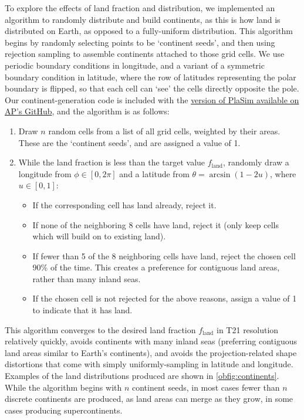 \documentclass[fleqn,usenatbib]{mnras}
\begin{document}
To explore the effects of land fraction and distribution, we implemented an algorithm to randomly distribute and build continents, as this is how land is distributed on Earth, as opposed to a fully-uniform distribution. This algorithm begins by randomly selecting points to be `continent seeds', and then using rejection sampling to assemble continents attached to those grid cells. We use periodic boundary conditions in longitude, and a variant of a symmetric boundary condition in latitude, where the row of latitudes representing the polar boundary is flipped, so that each cell can `see' the cells directly opposite the pole. Our continent-generation code is included with the \href{https://doi.org/10.5281/zenodo.2602241}{version of PlaSim available on AP's GitHub}, and the algorithm is as follows:
\begin{enumerate}
\item Draw $n$ random cells from a list of all grid cells, weighted by their areas. These are the `continent seeds', and are assigned a value of 1.
\item While the land fraction is less than the target value $f_\text{land}$, randomly draw a longitude from $\phi\in[0,2\pi]$ and a latitude from $\theta=\arcsin(1-2u)$, where $u\in[0,1]$:
\begin{itemize}
    \item If the corresponding cell has land already, reject it.
    \item If none of the neighboring 8 cells have land, reject it (only keep cells which will build on to existing land).
    \item If fewer than 5 of the 8 neighboring cells have land, reject the chosen cell 90\% of the time. This creates a preference for contiguous land areas, rather than many inland seas.
    \item If the chosen cell is not rejected for the above reasons, assign a value of 1 to indicate that it has land.
\end{itemize}
\end{enumerate}
This algorithm converges to the desired land fraction $f_\text{land}$ in T21 resolution relatively quickly, avoids continents with many inland seas (preferring contiguous land areas similar to Earth's continents), and avoids the projection-related shape distortions that come with simply uniformly-sampling in latitude and longitude. Examples of the land distributions produced are shown in \autoref{obfig:continents}. While the algorithm begins with $n$ continent seeds, in most cases fewer than $n$ discrete continents are produced, as land areas can merge as they grow, in some cases producing supercontinents. 
\end{document}
